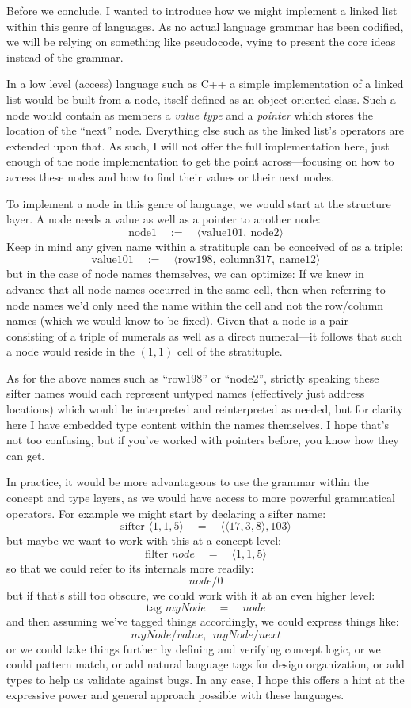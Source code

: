 \documentclass[twoside]{article}
\begin{document}
Before we conclude, I wanted to introduce how we might implement a linked list within this genre of languages.
As no actual language grammar has been codified, we will be relying on something like pseudocode, vying to
present the core ideas instead of the grammar.

In a low level (access) language such as C++ a simple implementation of a linked list would be built from a node,
itself defined as an object-oriented class. Such a node would contain as members a \emph{value type} and a \emph{pointer}
which stores the location of the ``next'' node. Everything else such as the linked list's operators are extended upon that.
As such, I will not offer the full implementation here, just enough of the node implementation to get the point
across---focusing on how to access these nodes and how to find their values or their next nodes.

To implement a node in this genre of language, we would start at the structure layer.
A node needs a value as well as a pointer to another node:
$$ \mbox{node}1\quad:=\quad\langle\mbox{value}101,\ \mbox{node}2\rangle $$
Keep in mind any given name within a stratituple can be conceived of as a triple:
$$ \mbox{value}101\quad:=\quad\langle\mbox{row}198,\ \mbox{column}317,\ \mbox{name}12\rangle $$
but in the case of node names themselves, we can optimize: If we knew in advance that all node names occurred in the
same cell, then when referring to node names we'd only need the name within the cell and not the row/column names
(which we would know to be fixed). Given that a node is a pair---consisting of a triple of numerals as well
as a direct numeral---it follows that such a node would reside in the $ (1, 1) $ cell of the stratituple.

As for the above names such as ``row198'' or ``node2'', strictly speaking these sifter names would each represent untyped
names (effectively just address locations) which would be interpreted and reinterpreted as needed, but for clarity here
I have embedded type content within the names themselves. I hope that's not too confusing, but if you've worked
with pointers before, you know how they can get.

In practice, it would be more advantageous to use the grammar within the concept and type layers, as we would have
access to more powerful grammatical operators. For example we might start by declaring a sifter name:
$$ \mbox{sifter }\langle 1,1,5\rangle\quad =\quad\langle\langle 17,3,8\rangle, 103\rangle $$
but maybe we want to work with this at a concept level:
$$ \mbox{filter }node\quad =\quad\langle 1,1,5\rangle $$
so that we could refer to its internals more readily:
$$ node/0 $$
but if that's still too obscure, we could work with it at an even higher level:
$$ \mbox{tag }myNode\quad =\quad node $$
and then assuming we've tagged things accordingly, we could express things like:
$$ myNode/value,\ \ myNode/next $$
or we could take things further by defining and verifying concept logic, or we could pattern match, or add natural language
tags for design organization, or add types to help us validate against bugs. In any case, I hope this offers a hint at the
expressive power and general approach possible with these languages.
\end{document}
